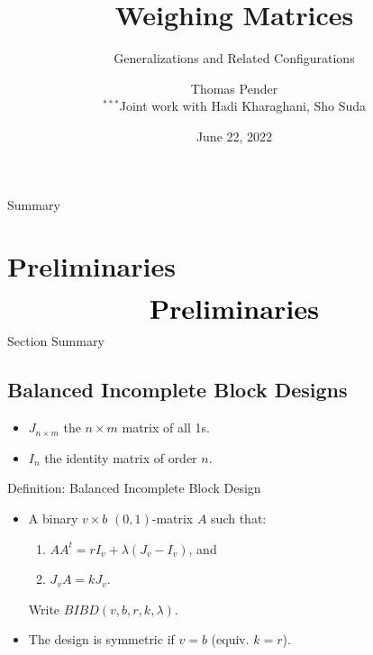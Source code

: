 \documentclass{beamer}
\title[Weighing Matrices]{Weighing Matrices}
\subtitle{Generalizations and Related Configurations}
\author[T. Pender]{Thomas Pender\\\scriptsize $^{***}$Joint work with Hadi Kharaghani, Sho Suda}
\institute[U of L]{Department of Mathematics and Computer Science\\University of
Lethbridge}
\date[06/22/2022]{June 22, 2022}
\begin{document}
\begin{frame}
  \titlepage
\end{frame}

\begin{frame}{Summary}
  \tableofcontents[hideallsubsections,sections={1-5}]
\end{frame}


\section{Preliminaries}

\begin{frame}
  \[
    \text{\huge\bf Preliminaries}
  \]
\end{frame}

\begin{frame}{Section Summary}
  \tableofcontents[sections={1}]
\end{frame}


\subsection{Balanced Incomplete Block Designs}

\begin{frame}

  \begin{itemize}
  \item $J_{n \times m}$ the $n \times m$ matrix of all 1s.
  \item $I_n$ the identity matrix of order $n$.
  \end{itemize}

  \begin{block}{Definition: Balanced Incomplete Block Design}
    \begin{itemize}
    \item A binary $v \times b$ $(0,1)$-matrix $A$ such that:
      \begin{enumerate}
      \item $AA^t = rI_v + \lambda(J_v-I_v)$, and
      \item $J_vA = kJ_v$.
      \end{enumerate}
      Write $BIBD(v,b,r,k,\lambda)$.
    \item The design is symmetric if $v=b$ (equiv. $k=r$).
    \end{itemize}
  \end{block}

\end{frame}
\end{document}
